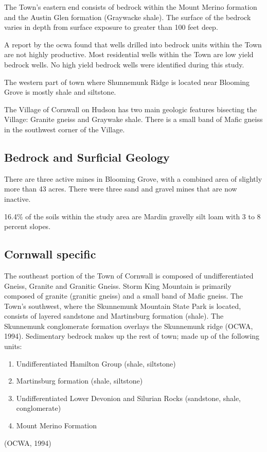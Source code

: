The Town's eastern end consists of bedrock within the Mount Merino formation and the
Austin Glen formation (Graywacke shale). The surface of the bedrock varies in depth from surface exposure to greater than 100 feet deep.

A report by the \gls{ocwa} found that wells drilled into 
bedrock units within the Town are not highly productive. Most residential wells 
within the Town are low yield bedrock wells. No high yield bedrock wells were 
identified during this study.

The western part of town where Shunnemunk Ridge is located near Blooming Grove 
is mostly shale and siltstone.

The Village of Cornwall on Hudson has two main geologic features bisecting the 
Village: Granite gneiss and Graywake shale. There is a small band of Mafic gneiss in the southwest corner of the Village.

\subsection{Bedrock and Surficial Geology}
There are three active mines in Blooming Grove, with a combined area of slightly more than 43 acres.
There were three sand and gravel mines that are now inactive.

16.4\% of the soils within the study area are Mardin gravelly silt loam with 3 to 8 percent slopes. 

\subsection{Cornwall specific}
The southeast portion of the Town of Cornwall is composed of undifferentiated Gneiss, Granite and Granitic Gneiss. Storm King Mountain is primarily composed of granite (granitic gneiss) and a small band of Mafic gneiss. The Town's southwest, where the Skunnemunk Mountain State Park is located, consists of layered sandstone and Martinsburg formation (shale). The Skunnemunk conglomerate formation overlays the Skunnemunk ridge (OCWA, 1994). Sedimentary bedrock makes up the rest of town; made up of the following units:

\begin{enumerate}
\item Undifferentiated Hamilton Group (shale, siltstone)
\item Martinsburg formation (shale, siltstone)
\item Undifferentiated Lower Devonion and Silurian Rocks (sandstone, shale, conglomerate)
\item Mount Merino Formation 
\end{enumerate}
(OCWA, 1994)

